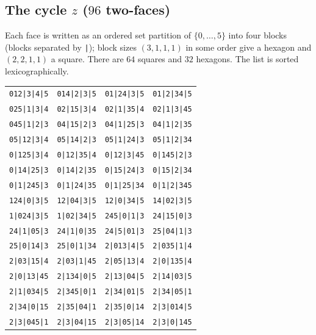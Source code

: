 \subsection*{The cycle $z$ ($96$ two-faces)}
Each face is written as an ordered set partition of $\{0,\dots,5\}$ into four blocks (blocks separated by \texttt{|}); block sizes $(3,1,1,1)$ in some order give a hexagon and $(2,2,1,1)$ a square. There are $64$ squares and $32$ hexagons. The list is sorted lexicographically.
\begin{center}\footnotesize\setlength{\tabcolsep}{6pt}
\begin{tabular}{llll}
\texttt{012|3|4|5} & \texttt{014|2|3|5} & \texttt{01|24|3|5} & \texttt{01|2|34|5} \\
\texttt{025|1|3|4} & \texttt{02|15|3|4} & \texttt{02|1|35|4} & \texttt{02|1|3|45} \\
\texttt{045|1|2|3} & \texttt{04|15|2|3} & \texttt{04|1|25|3} & \texttt{04|1|2|35} \\
\texttt{05|12|3|4} & \texttt{05|14|2|3} & \texttt{05|1|24|3} & \texttt{05|1|2|34} \\
\texttt{0|125|3|4} & \texttt{0|12|35|4} & \texttt{0|12|3|45} & \texttt{0|145|2|3} \\
\texttt{0|14|25|3} & \texttt{0|14|2|35} & \texttt{0|15|24|3} & \texttt{0|15|2|34} \\
\texttt{0|1|245|3} & \texttt{0|1|24|35} & \texttt{0|1|25|34} & \texttt{0|1|2|345} \\
\texttt{124|0|3|5} & \texttt{12|04|3|5} & \texttt{12|0|34|5} & \texttt{14|02|3|5} \\
\texttt{1|024|3|5} & \texttt{1|02|34|5} & \texttt{245|0|1|3} & \texttt{24|15|0|3} \\
\texttt{24|1|05|3} & \texttt{24|1|0|35} & \texttt{24|5|01|3} & \texttt{25|04|1|3} \\
\texttt{25|0|14|3} & \texttt{25|0|1|34} & \texttt{2|013|4|5} & \texttt{2|035|1|4} \\
\texttt{2|03|15|4} & \texttt{2|03|1|45} & \texttt{2|05|13|4} & \texttt{2|0|135|4} \\
\texttt{2|0|13|45} & \texttt{2|134|0|5} & \texttt{2|13|04|5} & \texttt{2|14|03|5} \\
\texttt{2|1|034|5} & \texttt{2|345|0|1} & \texttt{2|34|01|5} & \texttt{2|34|05|1} \\
\texttt{2|34|0|15} & \texttt{2|35|04|1} & \texttt{2|35|0|14} & \texttt{2|3|014|5} \\
\texttt{2|3|045|1} & \texttt{2|3|04|15} & \texttt{2|3|05|14} & \texttt{2|3|0|145} \\

\end{tabular}
\end{center}
